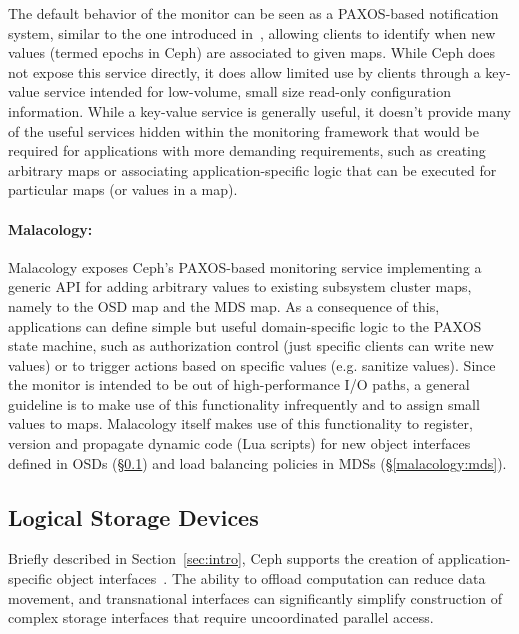 \documentclass[10pt,twocolumn]{article}
\begin{document}
The default behavior of the monitor can be seen as a PAXOS-based notification 
system, similar to the one introduced in~\cite{burrows_chubby_2006}, allowing 
clients to identify when new values (termed epochs in Ceph) are associated to 
given maps. While Ceph does not expose this service directly, it does allow 
limited use by clients through a key-value service intended for low-volume, 
small size read-only configuration information. While a key-value service is 
generally useful, it doesn't provide many of the useful services hidden within 
the monitoring framework that would be required for applications with more 
demanding requirements, such as creating arbitrary maps or associating 
application-specific logic that can be executed for particular maps (or values 
in a map).

\paragraph*{Malacology:} Malacology exposes Ceph's PAXOS-based monitoring
service implementing a generic API
for adding arbitrary values to existing subsystem cluster maps, namely to the 
OSD map and the MDS map. As a consequence of this, applications can define 
simple but useful domain-specific logic to the PAXOS state machine, such as 
authorization control (just specific clients can write new values) or to trigger 
actions based on specific values (e.g. sanitize values). Since the monitor is 
intended to be out of high-performance I/O paths, a general guideline is to make 
use of this functionality infrequently and to assign small values to maps. 
Malacology itself makes use of this functionality to register, version and 
propagate dynamic code (Lua scripts) for new object interfaces defined in OSDs 
(\S\ref{active-storage}) and load balancing policies in MDSs 
(\S\ref{malacology:mds}).

\subsection{Logical Storage Devices}
\label{active-storage}

Briefly described in Section~\ref{sec:intro}, Ceph supports the creation
of application-specific object interfaces~\cite{weil_rados_2007}. The ability
to offload computation can reduce data movement, and transnational interfaces can
significantly simplify construction of complex storage interfaces that require
uncoordinated parallel access. 
\end{document}
